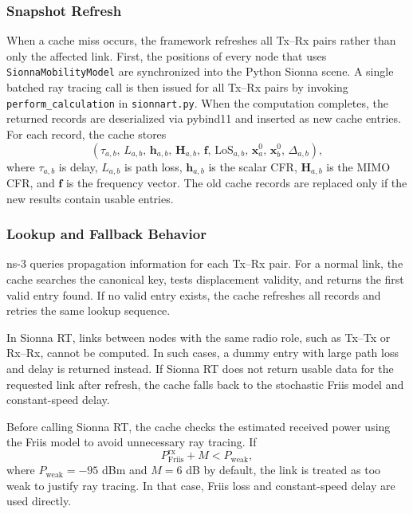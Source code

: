 \subsubsection{Snapshot Refresh}
\label{subsec:cache-refresh}

When a cache miss occurs, the framework refreshes all Tx–Rx pairs rather than only the affected link.
First, the positions of every node that uses \texttt{SionnaMobilityModel} are synchronized into the Python Sionna scene.
A single batched ray tracing call is then issued for all Tx–Rx pairs by invoking \texttt{perform\_calculation} in \texttt{sionnart.py}.
When the computation completes, the returned records are deserialized via pybind11 and inserted as new cache entries.
For each record, the cache stores
\begin{equation}
    \left(
    \tau_{a,b},\,
    L_{a,b},\,
    \mathbf{h}_{a,b},\,
    \mathbf{H}_{a,b},\,
    \mathbf{f},\,
    \mathrm{LoS}_{a,b},\,
    \mathbf{x}_a^0,\,
    \mathbf{x}_b^0,\,
    \Delta_{a,b}
    \right),
\end{equation}
where $\tau_{a,b}$ is delay, $L_{a,b}$ is path loss, $\mathbf{h}_{a,b}$ is the
scalar CFR, $\mathbf{H}_{a,b}$ is the MIMO CFR, and $\mathbf{f}$ is the
frequency vector.
The old cache records are replaced only if the new results contain usable entries.

\subsubsection{Lookup and Fallback Behavior}
\label{subsec:cache-lookup-fallback}

ns-3 queries propagation information for each Tx–Rx pair.
For a normal link, the cache searches the canonical key, tests displacement validity, and returns the first valid entry found.
If no valid entry exists, the cache refreshes all records and retries the same lookup sequence.

In Sionna RT, links between nodes with the same radio role, such as Tx–Tx or Rx–Rx, cannot be computed.
In such cases, a dummy entry with large path loss and delay is returned instead.
If Sionna RT does not return usable data for the requested link after refresh, the cache falls back to the stochastic Friis model and constant-speed delay.

Before calling Sionna RT, the cache checks the estimated received power using the Friis model to avoid unnecessary ray tracing.
If
\begin{equation}
    P_{\mathrm{Friis}}^{\mathrm{rx}} + M
    <
    P_{\mathrm{weak}},
\end{equation}
where $P_{\mathrm{weak}}=-95$ dBm and $M=6$ dB by default, the link is treated
as too weak to justify ray tracing.
In that case, Friis loss and constant-speed delay are used directly.

